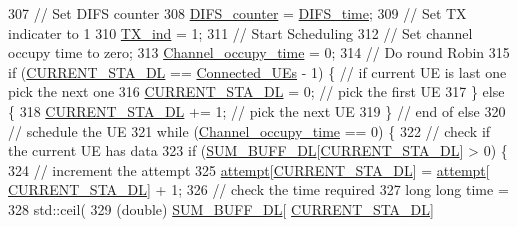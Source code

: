 \begin{DoxyCode}
307                 \textcolor{comment}{// Set DIFS counter}
308                 \hyperlink{classAP_ae8b5098c1fed76aeecdb1ed35f8952a1}{DIFS\_counter} = \hyperlink{classAP_a41453568719c530c6a7376273c02a6fa}{DIFS\_time};
309                 \textcolor{comment}{// Set TX indicater to 1}
310                 \hyperlink{classAP_adce53b419ff50565a7084b8d893c5be1}{TX\_ind} = 1;
311                 \textcolor{comment}{// Start Scheduling}
312                 \textcolor{comment}{// Set channel occupy time to zero;}
313                 \hyperlink{classAP_a2c168786c0400fa590bed7fabbca741e}{Channel\_occupy\_time} = 0;
314                 \textcolor{comment}{// Do round Robin}
315                 \textcolor{keywordflow}{if} (\hyperlink{classAP_aabddb8414a6a9ecdd51e7e2a03310eb9}{CURRENT\_STA\_DL} == \hyperlink{classAP_af0d927a781e8776c18758508a6845c85}{Connected\_UEs} - 1) \{ \textcolor{comment}{// if current UE is
       last one pick the next one}
316                     \hyperlink{classAP_aabddb8414a6a9ecdd51e7e2a03310eb9}{CURRENT\_STA\_DL} = 0; \textcolor{comment}{// pick the first UE}
317                 \} \textcolor{keywordflow}{else} \{
318                     \hyperlink{classAP_aabddb8414a6a9ecdd51e7e2a03310eb9}{CURRENT\_STA\_DL} += 1; \textcolor{comment}{// pick the next UE}
319                 \} \textcolor{comment}{// end of else}
320                   \textcolor{comment}{// schedule the UE}
321                 \textcolor{keywordflow}{while} (\hyperlink{classAP_a2c168786c0400fa590bed7fabbca741e}{Channel\_occupy\_time} == 0) \{
322                     \textcolor{comment}{// check if the current UE has data}
323                     \textcolor{keywordflow}{if} (\hyperlink{classAP_aaff6ce72b09dc955c0aaff3dc9fa0f04}{SUM\_BUFF\_DL}[\hyperlink{classAP_aabddb8414a6a9ecdd51e7e2a03310eb9}{CURRENT\_STA\_DL}] > 0) \{
324                         \textcolor{comment}{// increment the attempt}
325                         \hyperlink{classAP_aa15c857fb5fb5d7688f1ee49d43a2aee}{attempt}[\hyperlink{classAP_aabddb8414a6a9ecdd51e7e2a03310eb9}{CURRENT\_STA\_DL}] = \hyperlink{classAP_aa15c857fb5fb5d7688f1ee49d43a2aee}{attempt}[
      \hyperlink{classAP_aabddb8414a6a9ecdd51e7e2a03310eb9}{CURRENT\_STA\_DL}] + 1;
326                         \textcolor{comment}{// check the time required}
327                         \textcolor{keywordtype}{long} \textcolor{keywordtype}{long} time =
328                                 std::ceil(
329                                         (\textcolor{keywordtype}{double}) \hyperlink{classAP_aaff6ce72b09dc955c0aaff3dc9fa0f04}{SUM\_BUFF\_DL}[
      \hyperlink{classAP_aabddb8414a6a9ecdd51e7e2a03310eb9}{CURRENT\_STA\_DL}]

\end{DoxyCode}
